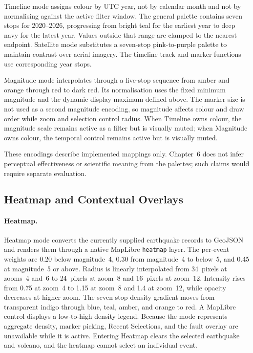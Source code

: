 \documentclass[12pt]{article}
\begin{document}
Timeline mode assigns colour by UTC year, not by calendar month and not by normalising against the active filter window. The general palette contains seven stops for 2020--2026, progressing from bright teal for the earliest year to deep navy for the latest year. Values outside that range are clamped to the nearest endpoint. Satellite mode substitutes a seven-stop pink-to-purple palette to maintain contrast over aerial imagery. The timeline track and marker functions use corresponding year stops.

Magnitude mode interpolates through a five-stop sequence from amber and orange through red to dark red. Its normalisation uses the fixed minimum magnitude and the dynamic display maximum defined above. The marker size is not used as a second magnitude encoding, so magnitude affects colour and draw order while zoom and selection control radius. When Timeline owns colour, the magnitude scale remains active as a filter but is visually muted; when Magnitude owns colour, the temporal control remains active but is visually muted.

These encodings describe implemented mappings only. Chapter~6 does not infer perceptual effectiveness or scientific meaning from the palettes; such claims would require separate evaluation.

\subsection{Heatmap and Contextual Overlays}
\label{subsec:frontend_overlays}

\paragraph{Heatmap.} Heatmap mode converts the currently supplied earthquake records to GeoJSON and renders them through a native MapLibre \texttt{heatmap} layer. The per-event weights are 0.20 below magnitude~4, 0.30 from magnitude~4 to below~5, and 0.45 at magnitude~5 or above. Radius is linearly interpolated from 34~pixels at zooms~4 and~6 to 24~pixels at zoom~8 and 16~pixels at zoom~12. Intensity rises from 0.75 at zoom~4 to 1.15 at zoom~8 and 1.4 at zoom~12, while opacity decreases at higher zoom. The seven-stop density gradient moves from transparent indigo through blue, teal, amber, and orange to red. A MapLibre control displays a low-to-high density legend. Because the mode represents aggregate density, marker picking, Recent Selections, and the fault overlay are unavailable while it is active. Entering Heatmap clears the selected earthquake and volcano, and the heatmap cannot select an individual event.
\end{document}
